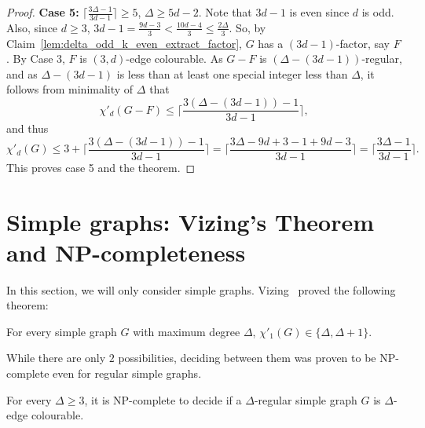 \begin{proof}
\textbf{Case 5:} 
$\lceil \frac{3\Delta - 1}{3d - 1} \rceil \geq 5$, $\Delta \geq  5d - 2$. 
Note that $3d-1$ is even since $d$ is odd. Also, since $d \geq 3$, $3d-1 = \frac{9d-3}{3} <  \frac{10d-4}{3} \leq \frac{2\Delta}{3}$. 
So, by Claim~\ref{lem:delta_odd_k_even_extract_factor}, $G$ has a $(3d-1)$-factor, say $F$. By Case 3, $F$ is $(3,d)$-edge colourable. As $G-F$ is $(\Delta-(3d-1))$-regular, and as $\Delta-(3d-1)$ is less than at least one special integer less than $\Delta$, it follows from minimality of $\Delta$ that 
$$\chi'_{d}(G-F) \leq \lceil \frac{3(\Delta - (3d - 1)) - 1}{3d - 1} \rceil,$$
and thus 
$$\chi'_{d}(G) \leq 3 + \lceil \frac{3(\Delta - (3d - 1)) - 1}{3d - 1} \rceil = \lceil \frac{3\Delta - 9d + 3 - 1 + 9d - 3}{3d-1} \rceil = \lceil \frac{3\Delta - 1}{3d - 1} \rceil.$$
This proves case 5 and the theorem. 
\end{proof}


\section{Simple graphs: Vizing's Theorem and NP-completeness}\label{sec:simple}


In this section, we will only consider simple graphs. Vizing~\cite{V64} proved the following theorem:

\begin{theorem} \label{thm:vizing}
For every simple graph $G$ with maximum degree $\Delta$, $\chi'_{1}(G) \in \{ \Delta, \Delta + 1 \}$.
\end{theorem}

While there are only $2$ possibilities, deciding between them was proven to be NP-complete even for regular simple graphs. 

\begin{theorem}
\label{thm:chromatic_index_NP_complete}
For every $\Delta \geq 3$, it is NP-complete to decide if a $\Delta$-regular simple graph $G$ is $\Delta$-edge colourable. 
\end{theorem}

